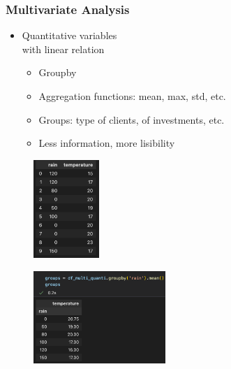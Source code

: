 \begin{frame}\frametitle{Multivariate Analysis}
   \begin{minipage}{0.48\linewidth}
      \begin{itemize}
         \item Quantitative variables\\
               with linear relation
         \begin{itemize}
            \item Groupby
            \item Aggregation functions: mean, max, std, etc.
            \item Groups: type of clients, of investments, etc.
            \item Less information, more lisibility
         \end{itemize}
      \end{itemize}
      \begin{figure}[H]
         \includegraphics[width=2.5cm]{../images/illustrations/pattern_multivariate_quantitative_df.png}
      \end{figure}
   \end{minipage}
   \begin{minipage}{0.48\linewidth}
      \begin{figure}[H]
         \includegraphics[width=5cm]{../images/illustrations/pattern_multivariate_quantitative_groupby.png}
      \end{figure}
   \end{minipage}
\end{frame}


